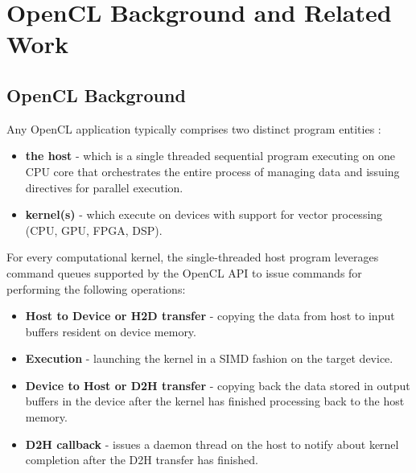 
\chapter{OpenCL Background and Related Work} %

\label{Chapter2} %



\section{OpenCL Background}

Any OpenCL application typically comprises two distinct program entities :
\begin{itemize}
	\item \textbf{the host} - which is a single threaded sequential program executing on one CPU core that orchestrates the entire process of managing data and issuing directives for parallel execution.
	\item \textbf{kernel(s)} - which execute on devices with support for vector processing (CPU, GPU, FPGA, DSP).
\end{itemize} 
For every computational kernel, the single-threaded host program leverages command queues supported by the OpenCL API to issue commands for  performing the following operations: 
\begin{itemize}
	\item \textbf{Host to Device or H2D transfer} - copying the data from host to input buffers resident on device memory. 
	\item \textbf{Execution} - launching the kernel in a SIMD fashion on the target device.
	\item \textbf{Device to Host or D2H transfer} - copying back the data stored in output buffers in the device after the kernel has finished processing back to the host memory.
	\item \textbf{D2H callback} - issues a daemon thread on the host to notify about kernel completion after the D2H transfer has finished.
\end{itemize}



